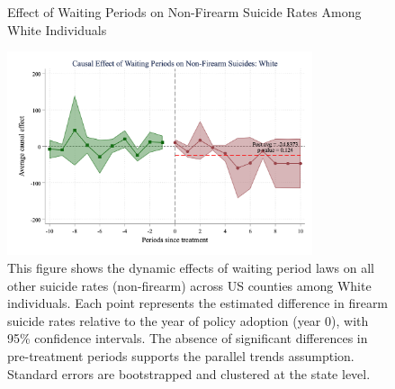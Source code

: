 \begin{figure}[htbp]
    \centering
    \caption{Effect of Waiting Periods on Non-Firearm Suicide Rates Among White Individuals}
    \label{fig:firearm_suicide_DID_other_white}
    \includegraphics[width=0.8\textwidth]{figures/1042-csid-white-other-noNY.png}
    \begin{minipage}{\linewidth}
    \caption*{\footnotesize{
    This figure shows the dynamic effects of waiting period laws on all other suicide rates (non-firearm) across US counties among White individuals. Each point represents the estimated difference in firearm suicide rates relative to the year of policy adoption (year 0), with 95\% confidence intervals. The absence of significant differences in pre-treatment periods supports the parallel trends assumption. Standard errors are bootstrapped and clustered at the state level. }}
  \end{minipage}
\end{figure}


\pagebreak
\clearpage

